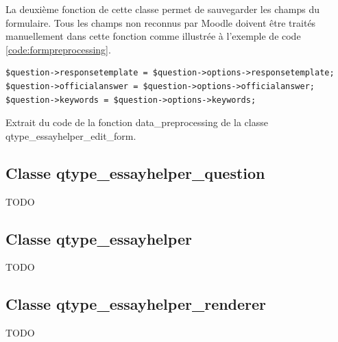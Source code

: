 La deuxi\`eme fonction de cette classe permet de sauvegarder les champs du formulaire.
Tous les champs non reconnus par Moodle doivent \^etre trait\'es manuellement dans cette fonction comme illustr\'ee \`a l'exemple de code \ref{code:formpreprocessing}.
\begin{lstfloat}
\begin{lstlisting}[frame=l]
$question->responsetemplate = $question->options->responsetemplate;
$question->officialanswer = $question->options->officialanswer;
$question->keywords = $question->options->keywords;
\end{lstlisting}
\caption{Extrait du code de la fonction data\_preprocessing de la classe qtype\_essayhelper\_edit\_form.}
\label{code:formpreprocessing}
\end{lstfloat}
\subsection*{Classe qtype\_essayhelper\_question}
TODO
\subsection*{Classe qtype\_essayhelper}
TODO
\subsection*{Classe qtype\_essayhelper\_renderer}
TODO
